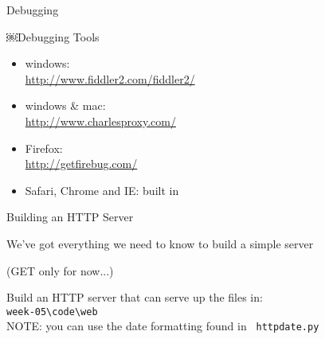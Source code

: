 \documentclass{beamer}
\begin{document}

\begin{frame}[fragile]{Debugging}

{\Large￼Debugging Tools}

\begin{itemize}
  \item windows:\\
    \url{http://www.fiddler2.com/fiddler2/}
  \item windows \& mac:\\
    \url{http://www.charlesproxy.com/}
  \item Firefox:\\ 
    \url{http://getfirebug.com/}
  \item Safari, Chrome and IE: built in
\end{itemize}

\end{frame}


\begin{frame}[fragile]{Building an HTTP Server}

\vfill
{\Large We've got everything we need to know to build a simple server}

\vfill
(GET only for now...)

\vfill
{\Large Build an HTTP server that can serve up the files in: \\[0.1in]
\verb|week-05\code\web|}\\

\vfill
NOTE: you can use the date formatting found in \verb| httpdate.py |
\end{frame}
\end{document}
